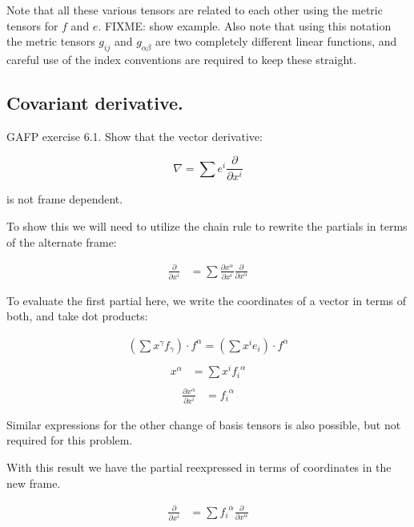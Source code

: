 \documentclass{article}      %
\begin{document}
Note that all these various tensors are related to each other using the metric tensors for $f$ and $e$.  FIXME: show example.  Also note that using this notation the metric tensors $g_{ij}$ and $g_{\alpha\beta}$ are two completely different linear functions, and careful use of the index conventions are required to keep these straight.

\subsection{ Covariant derivative. }

GAFP exercise 6.1.  Show that the vector derivative:

\begin{equation}
\nabla = \sum e^i \frac{\partial}{\partial x^i}
\end{equation}

is not frame dependent.

To show this we will need to utilize the chain rule to rewrite the partials in terms of the alternate frame:

\begin{align*}
\frac{\partial}{\partial x^i} &= \sum \frac{\partial x^\alpha}{\partial x^i} \frac{\partial}{\partial x^\alpha} 
\end{align*}

To evaluate the first partial here, we write the coordinates of a vector in terms of both, and take dot products:

\begin{align*}
\left(\sum x^{\gamma} f_{\gamma}\right) \cdot f^{\alpha} = \left(\sum x^i e_i\right) \cdot f^{\alpha} \\
\end{align*}
\begin{align*}
x^{\alpha} &= \sum x^i {f_i}^{\alpha} \\
\end{align*}
\begin{align*}
\frac{\partial x^{\alpha}}{\partial x^i} &= {f_i}^{\alpha}
\end{align*}

Similar expressions for the other change of basis tensors is also possible, but
not required for this problem.

With this result we have the partial reexpressed in terms of coordinates
in the new frame.

\begin{align*}
\frac{\partial}{\partial x^i} &= \sum {f_i}^{\alpha} \frac{\partial}{\partial x^\alpha} 
\end{align*}
\end{document}
